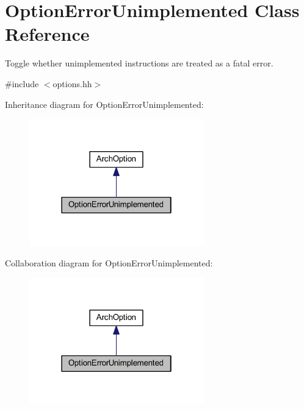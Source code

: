 \hypertarget{class_option_error_unimplemented}{}\section{Option\+Error\+Unimplemented Class Reference}
\label{class_option_error_unimplemented}


Toggle whether unimplemented instructions are treated as a fatal error.  




{\ttfamily \#include $<$options.\+hh$>$}



Inheritance diagram for Option\+Error\+Unimplemented\+:
\nopagebreak
\begin{figure}[H]
\begin{center}
\leavevmode
\includegraphics[width=214pt]{class_option_error_unimplemented__inherit__graph}
\end{center}
\end{figure}


Collaboration diagram for Option\+Error\+Unimplemented\+:
\nopagebreak
\begin{figure}[H]
\begin{center}
\leavevmode
\includegraphics[width=214pt]{class_option_error_unimplemented__coll__graph}
\end{center}
\end{figure}
